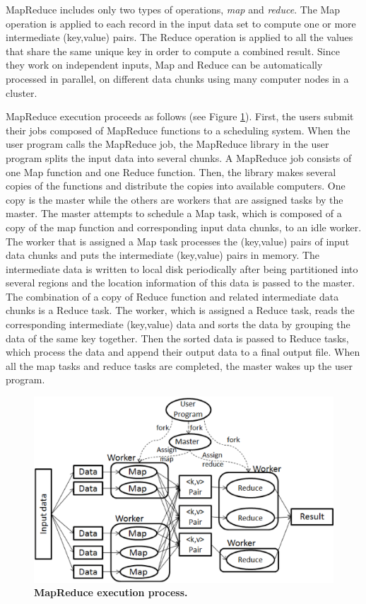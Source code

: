MapReduce includes only two types of operations, \emph{map} and
\emph{reduce}. The Map operation is applied to each
record in the input data set to compute one or more intermediate
(key,value) pairs. The Reduce operation is applied to all the values
that share the same unique key in order to compute a combined
result. Since they work on independent inputs, Map and Reduce can be
automatically processed in parallel, on different data chunks
using many computer nodes in a cluster. 

MapReduce execution proceeds as follows (see Figure \ref{fig:f7}).
First, the users submit their jobs composed of  MapReduce functions to a scheduling system. 
When the user program calls the MapReduce job, the MapReduce library in the user program splits the input data into several chunks.
A MapReduce job consists of one Map function and one Reduce function.
Then, the library makes several copies of the functions and distribute the copies into available computers. 
One copy is the master while the others are workers that
are assigned tasks by the master. 
The master attempts to schedule a Map task, which is composed of a copy of the map function and corresponding input data chunks, to an idle worker. 
The worker that is assigned a Map task processes the (key,value)
pairs of input data chunks and puts the intermediate (key,value)
pairs in memory. 
The intermediate data is written to local disk periodically
after being partitioned into several regions and the location information of this data is passed to the master. 
The combination of a copy of Reduce function and related intermediate data chunks is a Reduce task.
The worker, which is assigned a Reduce
task, reads the corresponding intermediate (key,value) data and sorts the data by grouping the data of the
same key together. Then the sorted data is passed to 
Reduce tasks, which process the data and append their output data to a final output file. 
When all the map tasks and reduce tasks are completed, the master wakes up the user program.


\begin{figure}
\begin{centering}
\captionsetup{justification=centering}
\includegraphics[width=129mm]{figures/f7}
\par\end{centering}

\caption{\textbf{MapReduce execution process. }}
\label{fig:f7} 
\end{figure}


